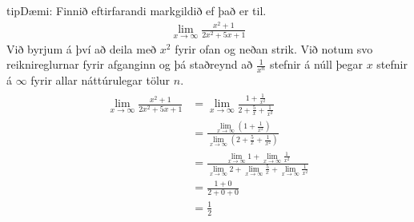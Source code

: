 \documentclass[a4paper,10pt,icelandic]{sphinxmanual}
\begin{document}
\begin{sphinxadmonition}{tip}{Dæmi:}
Finnið eftirfarandi markgildið ef það er til.
\begin{equation*}
\begin{split}\lim_{x \to \infty} \frac{x^2 + 1}{2x^2 + 5x +1}\end{split}
\end{equation*}
Við byrjum á því að deila með \(x^2\) fyrir ofan og neðan strik. Við notum svo reiknireglurnar fyrir afganginn og þá staðreynd að \(\frac{1}{x^n}\) stefnir á núll þegar \(x\) stefnir á \(\infty\) fyrir allar náttúrulegar tölur \(n\).
\begin{equation*}
\begin{split}\begin{aligned}
\lim_{x \to \infty} \frac{x^2 + 1}{2x^2 + 5x +1}
&= \lim_{x \to \infty} \frac{1 + \frac{1}{x^2}}{2 + \frac{5}{x} + \frac{1}{x^2}} \\
&= \frac{\lim_{x \to \infty}( 1 + \frac{1}{x^2})}{\lim_{x \to \infty}( 2 + \frac{5}{x} + \frac{1}{x^2})} \\
&=\frac{\lim_{x \to \infty}1+\lim_{x \to \infty} \frac{1}{x^2}}{\lim_{x \to \infty}2+\lim_{x \to \infty} \frac{5}{x} +\lim_{x \to \infty} \frac{1}{x^2}} \\
&=\frac{1+0}{2+0+0}\\
&=\frac{1}{2}
\end{aligned}\end{split}
\end{equation*}\end{sphinxadmonition}
\end{document}
